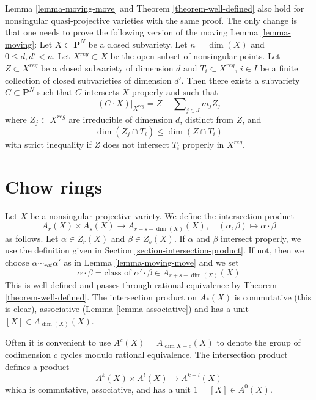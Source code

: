 \begin{remark}
\label{remark-quasi-projective}
Lemma \ref{lemma-moving-move} and
Theorem \ref{theorem-well-defined}
also hold for nonsingular quasi-projective varieties with
the same proof. The only change is that one needs to prove the following
version of the moving Lemma \ref{lemma-moving}: Let  $X \subset \mathbf{P}^N$
be a closed subvariety. Let $n = \dim(X)$ and $0 \leq d, d' < n$. Let
$X^{reg} \subset X$ be the open subset of nonsingular points. Let
$Z \subset X^{reg}$ be a closed subvariety of dimension $d$ and
$T_i \subset X^{reg}$, $i \in I$ be a finite collection of closed subvarieties
of dimension $d'$. Then there exists a subvariety $C \subset \mathbf{P}^N$
such that $C$ intersects $X$ properly and such that
$$
(C \cdot X)|_{X^{reg}} = Z + \sum\nolimits_{j \in J} m_j Z_j
$$
where $Z_j \subset X^{reg}$ are irreducible of dimension $d$, distinct
from $Z$, and
$$
\dim(Z_j \cap T_i) \leq \dim(Z \cap T_i)
$$
with strict inequality if $Z$ does not intersect $T_i$ properly in $X^{reg}$.
\end{remark}



\section{Chow rings}
\label{section-chow-rings}

\noindent
Let $X$ be a nonsingular projective variety. We define the intersection
product
$$
A_r(X) \times A_s(X) \longrightarrow A_{r + s - \dim(X)}(X),\quad
(\alpha, \beta) \longmapsto \alpha \cdot \beta
$$
as follows. Let $\alpha \in Z_r(X)$ and $\beta \in Z_s(X)$.
If $\alpha$ and $\beta$ intersect properly, we use the
definition given in Section \ref{section-intersection-product}.
If not, then we choose $\alpha \sim_{rat} \alpha'$ as in
Lemma \ref{lemma-moving-move} and we set
$$
\alpha \cdot \beta =
\text{class of }\alpha' \cdot \beta \in A_{r + s - \dim(X)}(X)
$$
This is well defined and passes through rational equivalence by
Theorem \ref{theorem-well-defined}. The intersection product
on $A_*(X)$ is commutative (this is clear), associative
(Lemma \ref{lemma-associative}) and has a unit $[X] \in A_{\dim(X)}(X)$.

\medskip\noindent
Often it is convenient to use $A^c(X) = A_{\dim X - c}(X)$ to denote the
group of codimension $c$ cycles modulo rational equivalence.
The intersection product defines a product
$$
A^k(X) \times A^l(X) \longrightarrow A^{k+l}(X)
$$
which is commutative, associative, and has a unit $1 = [X] \in A^0(X)$.


